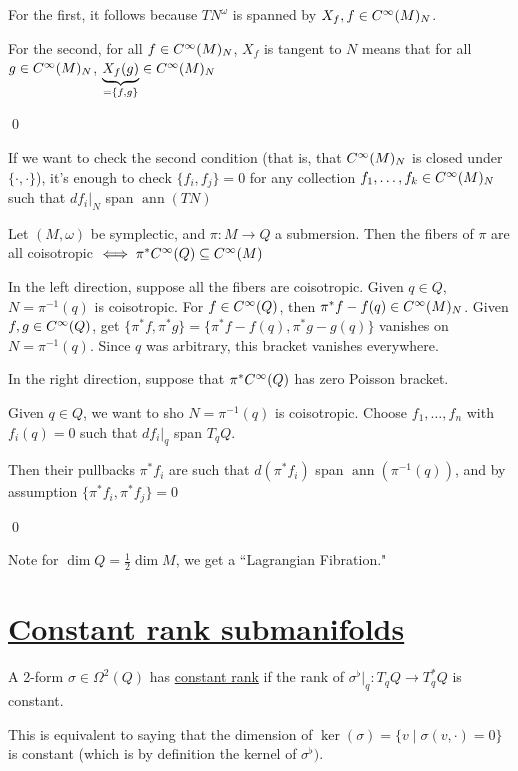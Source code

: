 \documentclass[x11names,reqno,14pt]{extarticle}
\newcommand{\pois}[2]{\{#1,#2\}}
\DeclareMathOperator{\ann}{ann}
\begin{document}
\proof

For the first, it follows because $TN^\omega$ is spanned by $X_f, f \in C^\infty(M)_N$.

For the second, for all $f \in C^\infty(M)_N$, $X_f$ is tangent to $N$ means that for all $g\in C^\infty(M)_N$, $\underbrace{X_f(g)}_{=\pois{f}{g}} \in C^\oo(M)_N$

\qed

If we want to check the second condition (that is, that $C^\infty(M)_N$ is closed under $\pois{\cdot}{\cdot}$), it's enough to check $\pois{f_i}{f_j} = 0$ for any collection $f_1, \dots, f_k \in C^\infty(M)_N$ such that $df_i|_N$ span $\ann(TN)$

\prop

Let $(M,\omega)$ be symplectic, and $\pi:M\to Q$ a submersion. Then the fibers of $\pi$ are all coisotropic $\iff \pi^*C^\infty(Q) \subseteq C^\infty(M)$ 

\proof

In the left direction, suppose all the fibers are coisotropic. Given $q \in Q$, $N = \pi^{-1}(q)$ is coisotropic. For $f \in C^\infty(Q)$, then $\pi^*f - f(q) \in C^\infty(M)_N$. Given $f, g \in C^\infty(Q)$, get $\pois{\pi^*f}{\pi^*g} = \pois{\pi^*f - f(q)}{\pi^*g - g(q)}$ vanishes on $N = \pi^{-1}(q)$. Since $q$ was arbitrary, this bracket vanishes everywhere. 

In the right direction, suppose that $\pi^*C^\infty(Q)$ has zero Poisson bracket. 

Given $q\in Q$, we want to sho $N = \pi^{-1}(q)$ is coisotropic. Choose $f_1,\dots, f_n$ with $f_i(q) = 0$ such that $df_i|_q$ span $T_qQ$. 

Then their pullbacks $\pi^*f_i$ are such that $d(\pi^*f_i)$ span $\ann(\pi^{-1}(q))$, and by assumption $\pois{\pi^*f_i}{ \pi^*f_j} = 0$

\qed

Note for $\dim Q = \frac12\dim M$, we get a ``Lagrangian Fibration."

\section*{\underline{Constant rank submanifolds}}


A 2-form $\sigma\in\Omega^2(Q)$ has \underline{constant rank} if the rank of $\sigma^\flat|_q:T_qQ\to T_q^*Q$ is constant. 

This is equivalent to saying that the dimension of $\ker(\sigma) = \{v\mid \sigma(v,\cdot) =0\}$ is constant (which is by definition the kernel of $\sigma^\flat)$.
\end{document}
